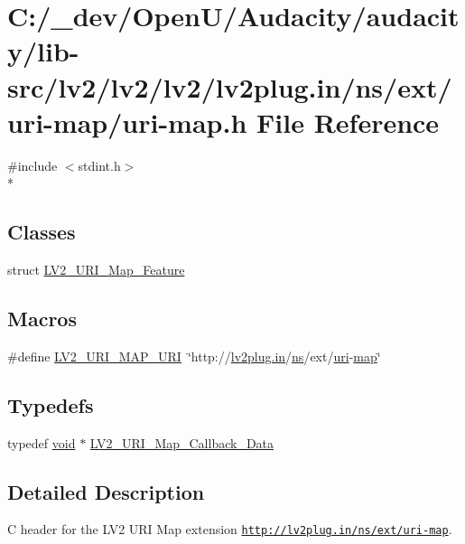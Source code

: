 \hypertarget{uri-map_8h}{}\section{C\+:/\+\_\+dev/\+Open\+U/\+Audacity/audacity/lib-\/src/lv2/lv2/lv2/lv2plug.in/ns/ext/uri-\/map/uri-\/map.h File Reference}
\label{uri-map_8h}
{\ttfamily \#include $<$stdint.\+h$>$}\\*
\subsection*{Classes}
\begin{DoxyCompactItemize}
\item 
struct \hyperlink{struct_l_v2___u_r_i___map___feature}{L\+V2\+\_\+\+U\+R\+I\+\_\+\+Map\+\_\+\+Feature}
\end{DoxyCompactItemize}
\subsection*{Macros}
\begin{DoxyCompactItemize}
\item 
\#define \hyperlink{uri-map_8h_af33637fe4fc667b1e864fe5cb54eb1d7}{L\+V2\+\_\+\+U\+R\+I\+\_\+\+M\+A\+P\+\_\+\+U\+RI}~\char`\"{}http\+://\hyperlink{latency_8c_a7d946209d777cb95fe30364b8d321207}{lv2plug.\+in}/\hyperlink{xmltok_8c_ab6aec1346fb6c7b2733f0f73c9536ad2}{ns}/ext/\hyperlink{lib_2expat_8h_a5a9fdd6c2606370ad12f24c078ac6585}{uri}-\/\hyperlink{structmap}{map}\char`\"{}
\end{DoxyCompactItemize}
\subsection*{Typedefs}
\begin{DoxyCompactItemize}
\item 
typedef \hyperlink{sound_8c_ae35f5844602719cf66324f4de2a658b3}{void} $\ast$ \hyperlink{uri-map_8h_adbac08f0bf00040db3c0298270df0c62}{L\+V2\+\_\+\+U\+R\+I\+\_\+\+Map\+\_\+\+Callback\+\_\+\+Data}
\end{DoxyCompactItemize}


\subsection{Detailed Description}
C header for the L\+V2 U\+RI Map extension \href{http://lv2plug.in/ns/ext/uri-map}{\tt http\+://lv2plug.\+in/ns/ext/uri-\/map}.

